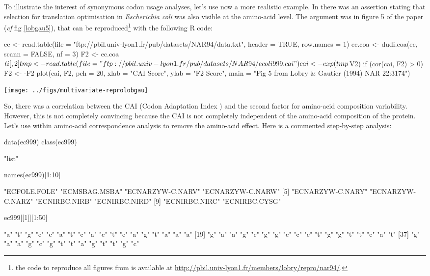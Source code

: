 \documentclass{article}
\begin{document}
To illustrate the interest of synonymous codon usage analyses, let's use now a more realistic example.
In \cite{lobrygautier} there was an assertion stating that selection for
translation optimisation in \textit{Escherichia coli} was also visible at the amino-acid level.
The argument was in figure 5 of the paper (\textit{cf} fig \ref{lobgau5}), that can be reproduced\footnote{
  the code to reproduce all figures from \cite{lobrygautier} is available at
  \url{http://pbil.univ-lyon1.fr/members/lobry/repro/nar94/}.
} with the following R code:

%
%
\begin{Schunk}
\begin{Sinput}
 ec <- read.table(file = "ftp://pbil.univ-lyon1.fr/pub/datasets/NAR94/data.txt", 
     header = TRUE, row.names = 1)
 ec.coa <- dudi.coa(ec, scann = FALSE, nf = 3)
 F2 <- ec.coa$li[, 2]
 tmp <- read.table(file = "ftp://pbil.univ-lyon1.fr/pub/datasets/NAR94/ecoli999.cai")
 cai <- exp(tmp$V2)
 if (cor(cai, F2) > 0) F2 <- -F2
 plot(cai, F2, pch = 20, xlab = "CAI Score", ylab = "F2 Score", 
     main = "Fig 5 from Lobry & Gautier (1994) NAR 22:3174")
\end{Sinput}
\end{Schunk}
\texttt{[image: ../figs/multivariate-reprolobgau]}


So, there was a correlation between the CAI (Codon Adaptation Index \cite{CAI}) and
the second factor for amino-acid composition variability. However, this
is not completely convincing because the CAI is not completely independent
of the amino-acid composition of the protein. Let's use within amino-acid
correspondence analysis to remove the amino-acid effect. Here is a commented
step-by-step analysis:

\begin{Schunk}
\begin{Sinput}
 data(ec999)
 class(ec999)
\end{Sinput}
\begin{Soutput}
[1] "list"
\end{Soutput}
\begin{Sinput}
 names(ec999)[1:10]
\end{Sinput}
\begin{Soutput}
 [1] "ECFOLE.FOLE"     "ECMSBAG.MSBA"    "ECNARZYW-C.NARV" "ECNARZYW-C.NARW"
 [5] "ECNARZYW-C.NARY" "ECNARZYW-C.NARZ" "ECNIRBC.NIRB"    "ECNIRBC.NIRD"   
 [9] "ECNIRBC.NIRC"    "ECNIRBC.CYSG"   
\end{Soutput}
\begin{Sinput}
 ec999[[1]][1:50]
\end{Sinput}
\begin{Soutput}
 [1] "a" "t" "g" "c" "c" "a" "t" "c" "a" "c" "t" "c" "a" "g" "t" "a" "a" "a"
[19] "g" "a" "a" "g" "c" "g" "g" "c" "c" "c" "t" "g" "g" "t" "t" "c" "a" "t"
[37] "g" "a" "a" "g" "c" "g" "t" "t" "a" "g" "t" "t" "g" "c"
\end{Soutput}
\end{Schunk}
\end{document}
